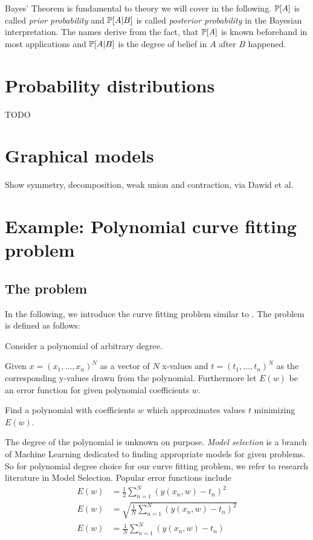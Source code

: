Bayes' Theorem is fundamental to theory we will cover in the following.
$\mathbb P[A]$ is called \emph{prior probability} and $\mathbb P[A|B]$ is called \emph{posterior probability} in the Bayesian interpretation.
The names derive from the fact, that $\mathbb P[A]$ is known beforehand in most applications and $\mathbb P[A|B]$ is the degree of belief in $A$ after $B$ happened.

\section{Probability distributions}
\label{sec:bp-dist}
%
TODO

\section{Graphical models}
\label{sec:bp-graphical-models}
%
Show symmetry, decomposition, weak union and contraction, via Dawid et al.

\section{Example: Polynomial curve fitting problem}
\label{sec:bp-curve-fitting}
%
\subsection{The problem}
%
In the following, we introduce the curve fitting problem similar to \cite[p.~4~ff.]{Bishop}.
The problem is defined as follows:

\begin{problem}
  Consider a polynomial of arbitrary degree.

  \begin{description}
  \item{Given}
  $x = (x_1, \ldots, x_n)^N$ as a vector of $N$ x-values and
  $t = (t_1, \ldots, t_n)^N$ as the corresponding y-values drawn from the polynomial.
  Furthermore let $E(w)$ be an error function for given polynomial coefficients $w$.

  \item{Find}
  a polynomial with coefficients $w$ which approximates values $t$ minimizing $E(w)$.
  \end{description}
\end{problem}

The degree of the polynomial is unknown on purpose.
\emph{Model selection} is a branch of Machine Learning dedicated to finding appropriate models for given problems.
So for polynomial degree choice for our curve fitting problem, we refer to research literature in Model Selection. %
Popular error functions include
\begin{align}
  E(w) &= \frac12 \sum_{n=1}^N \left(y(x_n, w) - t_n\right)^2 \tag{Mean squared error, MSE} \\
  E(w) &= \sqrt{\frac{1}{N} \sum_{n=1}^N (y(x_n, w) - t_n)^2} \tag{Root mean square, RMS} \\
  E(w) &= \frac1N \sum_{n=1}^N (y(x_n, w) - t_n)              \tag{Mean signed deviation, MSD}
\end{align}


